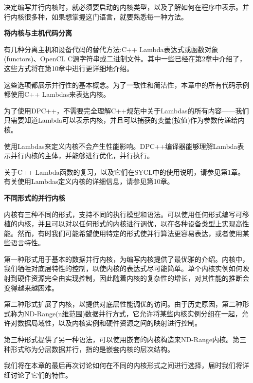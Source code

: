 决定编写并行内核时，就必须要启动的内核类型，以及了解如何在程序中表示。并行内核很多种，如果想掌握这门语言，就要熟悉每一种方法。\par

\hspace*{\fill} \par %
\textbf{将内核与主机代码分离}

有几种分离主机和设备代码的替代方法:C++ Lambda表达式或函数对象(functors)、OpenCL C源字符串或二进制文件。其中一些已经在第2章中介绍了，这些方式将在第10章中进行更详细地介绍。\par

这些选项都展示并行性的基本概念。为了一致性和简洁性，本章中的所有代码示例都使用C++ Lambdas来表达内核。\par

\begin{tcolorbox}[colback=blue!5!white,colframe=blue!75!black, title=Lambda无害于性能]
为了使用DPC++，不需要完全理解C++规范中关于Lambdas的所有内容——我们只需要知道Lambda可以表示内核，并且可以捕获的变量(按值)作为参数传递给内核。\par

使用Lambdas来定义内核不会产生性能影响。DPC++编译器能够理解Lambda表示并行内核的主体，并能够进行优化，并行执行。\par

关于C++ Lambda函数的复习，以及它们在SYCL中的使用说明，请参见第1章。有关使用Lambdas定义内核的详细信息，请参见第10章。
\end{tcolorbox}

\hspace*{\fill} \par %
\textbf{不同形式的并行内核}

内核有三种不同的形式，支持不同的执行模型和语法。可以使用任何形式编写可移植的内核，并且可以对以任何形式的内核进行调优，以在各种设备类型上实现高性能。然而，有时我们可能希望使用特定的形式使并行算法更容易表达，或者使用某些语言特性。\par

第一种形式用于基本的数据并行内核，为编写内核提供了最优雅的介绍。内核中，我们牺牲对底层特性的控制，以使内核的表达式尽可能简单。单个内核实例如何映射到硬件资源完全由实现控制，因此随着内核的复杂性的增长，对其性能的推断会变得越来越困难。\par

第二种形式扩展了内核，以提供对底层性能调优的访问。由于历史原因，第二种形式称为ND-Range(n维范围)数据并行方式，它允许将某些内核实例分组在一起，允许对数据局域性，以及内核实例和硬件资源之间的映射进行控制。\par

第三种形式提供了另一种语法，可以使用嵌套的内核构造来ND-Range内核。第三种形式称为分层数据并行，指的是嵌套内核的层次结构。\par

我们将在本章的最后再次讨论如何在不同的内核形式之间进行选择，届时我们将详细讨论了它们的特性。\par















